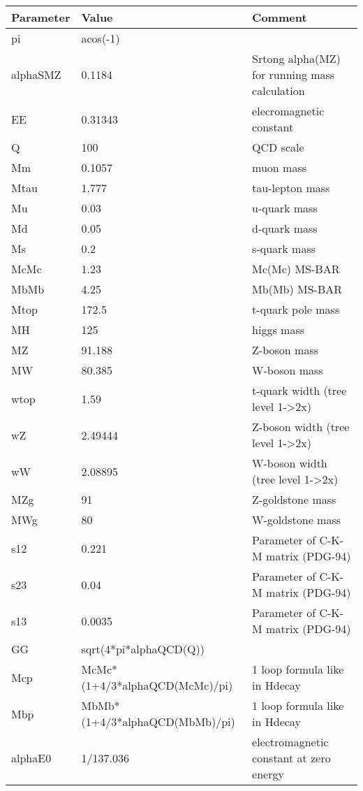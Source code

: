 \begin{tabular}{|l|l|l|} \hline
Parameter & Value & Comment \\ \hline
pi    &acos(-1)            & \\
alphaSMZ&0.1184              &Srtong alpha(MZ) for running mass calculation \\
EE    &0.31343             &elecromagnetic constant \\
Q     &100                 &QCD scale \\
Mm    &0.1057              &muon mass \\
Mtau  &1.777               &tau-lepton mass \\
Mu    &0.03                &u-quark mass \\
Md    &0.05                &d-quark mass \\
Ms    &0.2                 &s-quark mass \\
McMc  &1.23                &Mc(Mc)  MS-BAR \\
MbMb  &4.25                &Mb(Mb)  MS-BAR \\
Mtop  &172.5               &t-quark pole mass \\
MH    &125                 &higgs mass \\
MZ    &91.188              &Z-boson mass \\
MW    &80.385              &W-boson mass \\
wtop  &1.59                &t-quark width (tree level 1->2x) \\
wZ    &2.49444             &Z-boson width        (tree level 1->2x) \\
wW    &2.08895             &W-boson width        (tree level 1->2x) \\
MZg   &91                  &Z-goldstone mass \\
MWg   &80                  &W-goldstone mass \\
s12   &0.221               &Parameter of C-K-M matrix (PDG-94) \\
s23   &0.04                &Parameter of C-K-M matrix (PDG-94) \\
s13   &0.0035              &Parameter of C-K-M matrix (PDG-94) \\
GG    &sqrt(4*pi*alphaQCD(Q))& \\
Mcp   &McMc*(1+4/3*alphaQCD(McMc)/pi)&1 loop formula like in Hdecay \\
Mbp   &MbMb*(1+4/3*alphaQCD(MbMb)/pi)&1 loop formula like in Hdecay \\
alphaE0&1/137.036           &electromagnetic constant at zero energy \\

\end{tabular}
